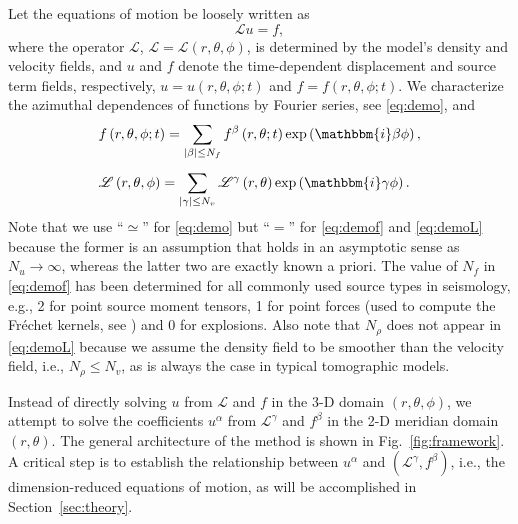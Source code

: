 \documentclass[extra]{gji}
\begin{document}
Let the equations of motion be loosely written as 
\begin{equation}
  \mathscr{L}u=f,
  \label{eq:eomloose}
\end{equation}
where the operator $\mathscr{L}$, $\mathscr{L}=\mathscr{L}\left(r,\theta,\phi\right)$, 
is determined by the model's density and velocity fields, and $u$ and $f$
denote the time-dependent displacement and source term fields, respectively,
$u=u\left(r,\theta,\phi;t\right)$ and $f=f\left(r,\theta,\phi;t\right)$. 
We characterize the azimuthal dependences of functions
by Fourier series, see \eqref{eq:demo}, and 
\begin{align}
  & f\left(r,\theta,\phi;t\right)=\sum_{|\beta| \le N_f} 
  f^\beta\left(r,\theta;t\right)\exp\left(\mathbbm{i}\beta\phi\right),
  \label{eq:demof}\\[.5em]
  & \mathscr{L}\left(r,\theta,\phi\right)=\sum_{|\gamma| \le N_v} 
  \mathscr{L}^\gamma\left(r,\theta\right)\exp\left(\mathbbm{i}\gamma\phi\right).  
  \label{eq:demoL}
\end{align}
Note that we use ``$\simeq$'' for \eqref{eq:demo} but ``$=$'' for 
\eqref{eq:demof} and \eqref{eq:demoL} because the former is an 
assumption that holds in an asymptotic sense as $N_u\rightarrow\infty$,
whereas the latter two are exactly known a priori.  
The value of $N_f$ in \eqref{eq:demof} has been determined for all 
commonly used source types in seismology, e.g., 
2 for point source moment tensors, 
1 for point forces (used to compute the Fr\'echet kernels, 
see \cite{nissen2007axisem}) and 0 for explosions. 
Also note that $N_\rho$ does not appear in \eqref{eq:demoL} because we 
assume the density field to be smoother than the velocity field, i.e., 
$N_\rho \le N_v$, as is always the case in typical tomographic models. 

Instead of directly solving $u$ from $\mathscr{L}$ and $f$ in the 3-D
domain $\left(r,\theta,\phi\right)$, we attempt to solve the coefficients $u^\alpha$ from 
$\mathscr{L}^\gamma$ and $f^\beta$ in the 2-D meridian domain $\left(r,\theta\right)$. 
The general architecture of the method is shown in Fig.~\ref{fig:framework}. A 
critical step is to establish the relationship between $u^\alpha$ and
$\left(\mathscr{L}^\gamma,f^\beta\right)$, i.e., the dimension-reduced
equations of motion, as will be accomplished in Section~\ref{sec:theory}.
\end{document}
